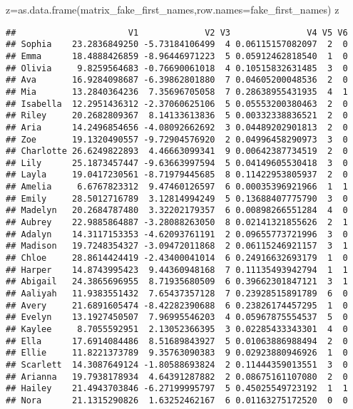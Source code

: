 \documentclass[
]{article}
\newenvironment{Shaded}{\begin{snugshade}}{\end{snugshade}}
\newcommand{\AttributeTok}[1]{\textcolor[rgb]{0.77,0.63,0.00}{#1}}
\newcommand{\FunctionTok}[1]{\textcolor[rgb]{0.00,0.00,0.00}{#1}}
\newcommand{\NormalTok}[1]{#1}
\newcommand{\OtherTok}[1]{\textcolor[rgb]{0.56,0.35,0.01}{#1}}
\begin{document}
\begin{Shaded}
\begin{Highlighting}[]
\NormalTok{z}\OtherTok{=}\FunctionTok{as.data.frame}\NormalTok{(matrix\_fake\_first\_names,}\AttributeTok{row.names=}\NormalTok{fake\_first\_names)}
\NormalTok{z}
\end{Highlighting}
\end{Shaded}

\begin{verbatim}
##                      V1             V2 V3               V4 V5 V6
## Sophia    23.2836849250 -5.73184106499  4 0.06115157082097  2  0
## Emma      18.4888426859 -8.96446971223  5 0.05912462818540  1  0
## Olivia     9.8259564683 -0.76690061018  4 0.10515832631485  3  0
## Ava       16.9284098687 -6.39862801880  7 0.04605200048536  2  0
## Mia       13.2840364236  7.35696705058  7 0.28638955431935  4  1
## Isabella  12.2951436312 -2.37060625106  5 0.05553200380463  2  0
## Riley     20.2682809367  8.14133613836  5 0.00332338836521  2  0
## Aria      14.2496854656 -4.08092662692  3 0.04489202901813  2  0
## Zoe       19.1320490557 -9.72904576920  2 0.04996458290973  3  0
## Charlotte 26.6249822893  4.46663099341  9 0.00642387734519  2  0
## Lily      25.1873457447 -9.63663997594  5 0.04149605530418  3  0
## Layla     19.0417230561 -8.71979445685  8 0.11422953805937  2  0
## Amelia     6.6767823312  9.47460126597  6 0.00035396921966  1  1
## Emily     28.5012716789  3.12814994249  5 0.13688407775790  3  0
## Madelyn   20.2684787480  3.32202179357  6 0.00898266551284  4  0
## Aubrey    22.9885864887 -3.28088263050  8 0.02141321855626  2  1
## Adalyn    14.3117153353 -4.62093761191  2 0.09655773721996  3  0
## Madison   19.7248354327 -3.09472011868  2 0.06115246921157  3  1
## Chloe     28.8614424419 -2.43400041014  6 0.24916632693179  1  0
## Harper    14.8743995423  9.44360948168  7 0.11135493942794  1  1
## Abigail   24.3865696955  8.71935680509  6 0.39662301847121  3  1
## Aaliyah   11.9383551432  7.65437357128  7 0.23928515891789  6  0
## Avery     21.6891605474 -8.42282390688  6 0.23826174457295  1  0
## Evelyn    13.1927450507  7.96995546203  4 0.05967875554537  5  0
## Kaylee     8.7055592951  2.13052366395  3 0.02285433343301  4  0
## Ella      17.6914084486  8.51689843927  5 0.01063886988494  2  0
## Ellie     11.8221373789  9.35763090383  9 0.02923880946926  1  0
## Scarlett  14.3087649124 -1.80588693824  2 0.11444359013551  3  0
## Arianna   19.7938178934  4.64391287882  2 0.08675161107080  2  0
## Hailey    21.4943703846 -6.27199995797  5 0.45025549723192  1  1
## Nora      21.1315290826  1.63252462167  6 0.01163275172520  0  0

\end{verbatim}
\end{document}
